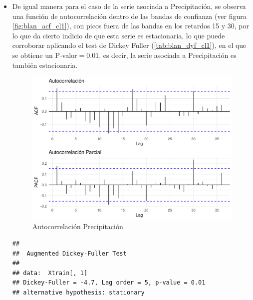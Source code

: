 \documentclass[12pt,oneside]{book}\usepackage[]{graphicx}\usepackage[]{color}
\makeatletter
\def\maxwidth{ %
  \ifdim\Gin@nat@width>\linewidth
    \linewidth
  \else
    \Gin@nat@width
  \fi
}
\newenvironment{kframe}{%
 \def\at@end@of@kframe{}%
 \ifinner\ifhmode%
  \def\at@end@of@kframe{\end{minipage}}%
  \begin{minipage}{\columnwidth}%
 \fi\fi%
 \def\FrameCommand##1{\hskip\@totalleftmargin \hskip-\fboxsep
 \colorbox{shadecolor}{##1}\hskip-\fboxsep
     \hskip-\linewidth \hskip-\@totalleftmargin \hskip\columnwidth}%
 \MakeFramed {\advance\hsize-\width
   \@totalleftmargin\z@ \linewidth\hsize
   \@setminipage}}%
 {\par\unskip\endMakeFramed%
 \at@end@of@kframe}
\newenvironment{knitrout}{}{} %
\theoremstyle{definition} %
\makeatother
\begin{document}
\begin{itemize}
\item De igual manera para el caso de la serie asociada a Precipitación, se observa una función de autocorrelación dentro de las bandas de confianza (ver figura \ref{fig:blan_acf_cl1}), con picos fuera de las bandas en los retardos 15 y 30, por lo que da cierto indicio de que esta serie es estacionaria, lo que puede corroborar aplicando el test de Dickey Fuller (\ref{tab:blan_dyf_cl1}), en el que se obtiene un P-valor$=0.01$, es decir, la serie asociada a Precipitación es también estacionaria.



\begin{knitrout}
\color{fgcolor}\begin{figure}[H]

{\centering \includegraphics[width=\maxwidth]{figure/unnamed-chunk-26-1} 

}

\caption{\label{fig:blan_acf_cl1} Autocorrelación Precipitación}\label{fig:unnamed-chunk-26}
\end{figure}


\end{knitrout}


\begin{knitrout}
\color{fgcolor}\begin{kframe}
\begin{verbatim}
## 
## 	Augmented Dickey-Fuller Test
## 
## data:  Xtrain[, 1]
## Dickey-Fuller = -4.7, Lag order = 5, p-value = 0.01
## alternative hypothesis: stationary
\end{verbatim}
\end{kframe}
\end{knitrout}
\label{tab:blan_dyf_cl1}



\end{itemize}
\end{document}
